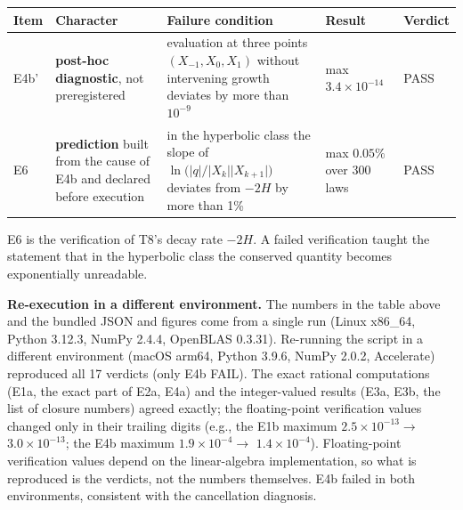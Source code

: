 \documentclass[
  a4paper,
]{article}
\newcounter{none} %
\begin{document}
{\def\LTcaptype{none} %
\begin{longtable}[]{@{}
  >{\raggedright\arraybackslash}p{}
  >{\raggedright\arraybackslash}p{}
  >{\raggedright\arraybackslash}p{}
  >{\raggedright\arraybackslash}p{}
  >{\raggedright\arraybackslash}p{}@{}}
\toprule\noalign{}
\begin{minipage}[b]{\linewidth}\raggedright
Item
\end{minipage} & \begin{minipage}[b]{\linewidth}\raggedright
Character
\end{minipage} & \begin{minipage}[b]{\linewidth}\raggedright
Failure condition
\end{minipage} & \begin{minipage}[b]{\linewidth}\raggedright
Result
\end{minipage} & \begin{minipage}[b]{\linewidth}\raggedright
Verdict
\end{minipage} \\
\midrule\noalign{}
\endhead
\bottomrule\noalign{}
\endlastfoot
E4b' & \textbf{post-hoc diagnostic}, not preregistered & evaluation at
three points \((X_{-1},X_0,X_1)\) without intervening growth deviates by
more than \(10^{-9}\) & max \(3.4\times10^{-14}\) & PASS \\
E6 & \textbf{prediction} built from the cause of E4b and declared before
execution & in the hyperbolic class the slope of
\(\ln\bigl(\lvert q\rvert/\lvert X_k\rvert\lvert X_{k+1}\rvert\bigr)\)
deviates from \(-2H\) by more than 1\% & max \(0.05\%\) over 300 laws &
PASS \\
\end{longtable}
}

E6 is the verification of T8's decay rate \(-2H\). A failed verification
taught the statement that in the hyperbolic class the conserved quantity
becomes exponentially unreadable.

\textbf{Re-execution in a different environment.} The numbers in the
table above and the bundled JSON and figures come from a single run
(Linux x86\_64, Python 3.12.3, NumPy 2.4.4, OpenBLAS 0.3.31). Re-running
the script in a different environment (macOS arm64, Python 3.9.6, NumPy
2.0.2, Accelerate) reproduced all 17 verdicts (only E4b FAIL). The exact
rational computations (E1a, the exact part of E2a, E4a) and the
integer-valued results (E3a, E3b, the list of closure numbers) agreed
exactly; the floating-point verification values changed only in their
trailing digits (e.g., the E1b maximum \(2.5\times10^{-13}\to\)
\(3.0\times10^{-13}\); the E4b maximum \(1.9\times10^{-4}\to\)
\(1.4\times10^{-4}\)). Floating-point verification values depend on the
linear-algebra implementation, so what is reproduced is the verdicts,
not the numbers themselves. E4b failed in both environments, consistent
with the cancellation diagnosis.
\end{document}
